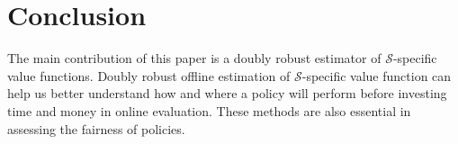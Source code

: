\section{Conclusion}
The main contribution of this paper is a doubly robust estimator of $\mathcal{S}$-specific value functions. Doubly robust offline estimation of $\mathcal{S}$-specific value function can help us better understand how and where a policy will perform before investing time and money in online evaluation. These methods are also essential in assessing the fairness of policies. 